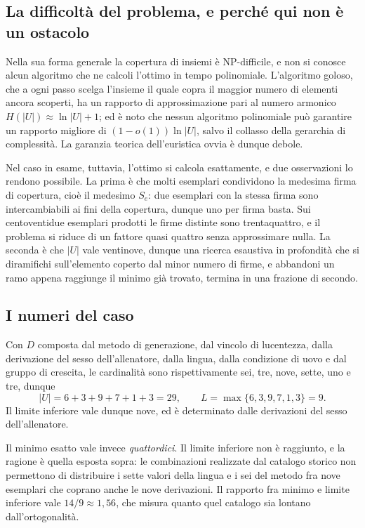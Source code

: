 \subsection*{La difficoltà del problema, e perché qui non è un ostacolo}

Nella sua forma generale la copertura di insiemi è NP-difficile, e non si conosce alcun algoritmo che ne calcoli l'ottimo in tempo polinomiale. L'algoritmo goloso, che a ogni passo scelga l'insieme il quale copra il maggior numero di elementi ancora scoperti, ha un rapporto di approssimazione pari al numero armonico $H(|U|) \approx \ln|U| + 1$; ed è noto che nessun algoritmo polinomiale può garantire un rapporto migliore di $(1-o(1))\ln|U|$, salvo il collasso della gerarchia di complessità. La garanzia teorica dell'euristica ovvia è dunque debole.

Nel caso in esame, tuttavia, l'ottimo si calcola esattamente, e due osservazioni lo rendono possibile. La prima è che molti esemplari condividono la medesima firma di copertura, cioè il medesimo $S_e$: due esemplari con la stessa firma sono intercambiabili ai fini della copertura, dunque uno per firma basta. Sui centoventidue esemplari prodotti le firme distinte sono trentaquattro, e il problema si riduce di un fattore quasi quattro senza approssimare nulla. La seconda è che $|U|$ vale ventinove, dunque una ricerca esaustiva in profondità che si diramifichi sull'elemento coperto dal minor numero di firme, e abbandoni un ramo appena raggiunge il minimo già trovato, termina in una frazione di secondo.

\subsection*{I numeri del caso}

Con $D$ composta dal metodo di generazione, dal vincolo di lucentezza, dalla derivazione del sesso dell'allenatore, dalla lingua, dalla condizione di uovo e dal gruppo di crescita, le cardinalità sono rispettivamente sei, tre, nove, sette, uno e tre, dunque
\begin{equation}
|U| = 6+3+9+7+1+3 = 29, \qquad L = \max\{6,3,9,7,1,3\} = 9 .
\end{equation}
Il limite inferiore vale dunque nove, ed è determinato dalle derivazioni del sesso dell'allenatore.

Il minimo esatto vale invece \emph{quattordici}. Il limite inferiore non è raggiunto, e la ragione è quella esposta sopra: le combinazioni realizzate dal catalogo storico non permettono di distribuire i sette valori della lingua e i sei del metodo fra nove esemplari che coprano anche le nove derivazioni. Il rapporto fra minimo e limite inferiore vale $14/9 \approx 1{,}56$, che misura quanto quel catalogo sia lontano dall'ortogonalità.


